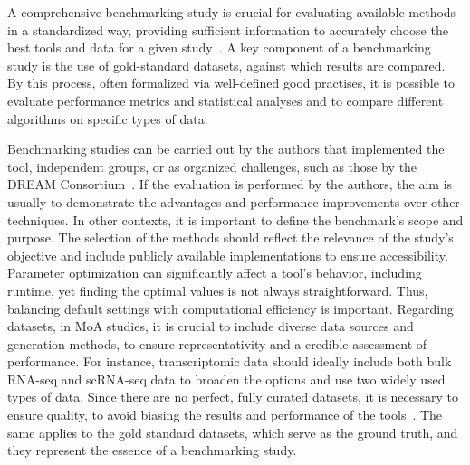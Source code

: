 A comprehensive benchmarking study is crucial for evaluating available methods in a standardized way, providing sufficient information to accurately choose the best tools and data for a given study~\cite{RN108}.
A key component of a benchmarking study is the use of gold-standard datasets, against which results are compared.
By this process, often formalized via well-defined good practises, it is possible to evaluate performance metrics and statistical analyses and to compare different algorithms on specific types of data. 

Benchmarking studies can be carried out by the authors that implemented the tool, independent groups, or as organized challenges, such as those by the \gls{DREAM} Consortium~\cite{RN109}.
If the evaluation is performed by the authors, the aim is usually to demonstrate the advantages and performance improvements over other techniques.
In other contexts, it is important to define the benchmark's scope and purpose.
The selection of the methods should reflect the relevance of the study's objective and include publicly available implementations to ensure accessibility.
Parameter optimization can significantly affect a tool's behavior, including runtime, yet finding the optimal values is not always straightforward.
Thus, balancing default settings with computational efficiency is important.
Regarding datasets, in \gls{MoA} studies, it is crucial to include diverse data sources and generation methods, to ensure representativity and a credible assessment of performance.
For instance, transcriptomic data should ideally include both bulk \gls{RNA-seq} and \gls{scRNA-seq} data to broaden the options and use two widely used types of data.
Since there are no perfect, fully curated datasets, it is necessary to ensure quality, to avoid biasing the results and performance of the tools~\cite{RN109}.
The same applies to the gold standard datasets, which serve as the ground truth, and they represent the essence of a benchmarking study.

